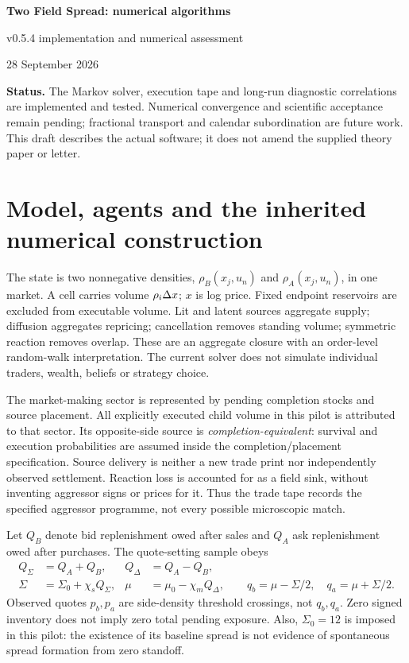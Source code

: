 \documentclass[11pt,a4paper]{article}
\begin{document}
\begin{center}
{\Large\bfseries Two Field Spread: numerical algorithms}\par
{\large v0.5.4 implementation and numerical assessment}\par
28 September 2026
\end{center}
\textbf{Status.} The Markov solver, execution tape and long-run diagnostic correlations are
implemented and tested. Numerical convergence and scientific acceptance
remain pending; fractional transport and calendar subordination are future work. This draft describes the actual
software; it does not amend the supplied theory paper or letter.

\section{Model, agents and the inherited numerical construction}
The state is two nonnegative densities, $\rho_B(x_j,u_n)$ and
$\rho_A(x_j,u_n)$, in one market. A cell carries volume $\rho_i\Delta x$;
$x$ is log price. Fixed endpoint reservoirs are excluded from executable
volume. Lit and latent sources aggregate supply; diffusion aggregates
repricing; cancellation removes standing volume; symmetric reaction removes
overlap. These are an aggregate closure with an order-level random-walk
interpretation. The current solver does not simulate individual traders,
wealth, beliefs or strategy choice.

The market-making sector is represented by pending completion stocks and
source placement. All explicitly executed child volume in this pilot is
attributed to that sector. Its opposite-side source is
\emph{completion-equivalent}: survival and execution probabilities are
assumed inside the completion/placement specification. Source delivery is
neither a new trade print nor independently observed settlement. Reaction
loss is accounted for as a field sink, without inventing aggressor signs or
prices for it. Thus the trade tape records the specified aggressor programme,
not every possible microscopic match.

Let $Q_B$ denote bid replenishment owed after sales and $Q_A$ ask
replenishment owed after purchases. The quote-setting sample obeys
\begin{align}
 Q_\Sigma&=Q_A+Q_B,& Q_\Delta&=Q_A-Q_B,\\
 \Sigma&=\Sigma_0+\chi_s Q_\Sigma,&
 \mu&=\mu_0-\chi_m Q_\Delta,\qquad
 q_b=\mu-\Sigma/2,\quad q_a=\mu+\Sigma/2.
\end{align}
Observed quotes $p_b,p_a$ are side-density threshold crossings, not $q_b,q_a$.
Zero signed inventory does not imply zero total pending exposure. Also,
$\Sigma_0=12$ is imposed in this pilot: the existence of its baseline spread
is not evidence of spontaneous spread formation from zero standoff.
\end{document}
